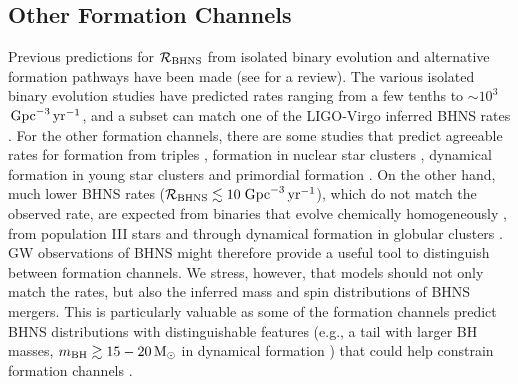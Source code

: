 \documentclass{aastex63}
\newcommand{\Msun}{\ensuremath{\,\rm{M}_{\odot}}\xspace}
\newcommand{\mbhf}{\ensuremath{m_{\rm{BH}}}\xspace}
\newcommand{\Rbhns}{\ensuremath{\mathcal{R}_{\rm{BHNS}}}\xspace}
\newcommand{\Gpcyr}{\ensuremath{\,\rm{Gpc}^{-3}\,\rm{yr}^{-1}}\xspace}
\begin{document}
\subsection{Other Formation Channels}

Previous predictions for \Rbhns from isolated binary evolution and alternative formation pathways have been made (see \citealt{MandelBroekgaardenReview:2021} for a review).  The various isolated binary evolution studies have predicted rates ranging from a  few tenths to $\sim 10^3$\Gpcyr, and a subset can match one of the LIGO-Virgo inferred \ac{BHNS} rates \citep[e.g.][]{Neijssel:2019,Belczynski:2020}. For the other formation channels, there are some studies that predict agreeable rates for formation from triples  \citep[e.g.][]{HamersThompson:2019}, formation in nuclear star clusters \citet[][but see also \citealt{PetrovichAntonini:2017, Hoang:2020}]{McKernan:2020}, dynamical formation in young star clusters \citep{Rastello:2020,Santoliquido:2020} and primordial formation \citep{Wang:2021}. On the other hand, much lower \ac{BHNS} rates ($\Rbhns\lesssim 10$\Gpcyr), which do not match the observed rate, are expected from binaries that evolve chemically homogeneously \citep{Marchant:2017}, from population III stars \citep{Belczynski:2017popIII} and through dynamical formation in globular clusters \citep{Clausen:2013,ArcaSedda:2020,Hoang:2020,Ye:2019}. \ac{GW} observations of \ac{BHNS} might therefore provide a useful tool to distinguish between formation channels. We stress, however, that models should not only match the rates, but also the inferred mass and spin distributions of \ac{BHNS} mergers. This is particularly valuable as some of the formation channels predict \ac{BHNS} distributions with distinguishable features (e.g., a tail with larger \ac{BH} masses, $\mbhf\gtrsim 15-20\Msun$ in dynamical formation  \citealt[][]{ArcaSedda:2020,Rastello:2020}) that could help constrain formation channels \citep[e.g.,][]{Stevenson:2017spin}.
\end{document}
